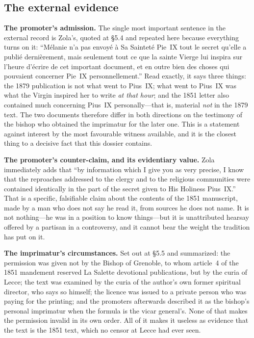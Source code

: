 \subsection{The external evidence}

\textbf{The promoter's admission.} The single most important
sentence in the external record is Zola's, quoted at \S5.4 and
repeated here because everything turns on it: ``Mélanie n'a pas
envoyé à Sa Sainteté Pie~IX tout le secret qu'elle a publié
dernièrement, mais seulement tout ce que la sainte Vierge lui inspira
sur l'heure d'écrire de cet important document, et en outre bien des
choses qui pouvaient concerner Pie~IX personnellement.'' Read
exactly, it says three things: the 1879 publication is not what went
to Pius~IX; what went to Pius~IX was what the Virgin inspired her to
write \emph{at that hour}; and the 1851 letter also contained much
concerning Pius~IX personally---that is, material \emph{not} in the
1879 text. The two documents therefore differ in both directions on
the testimony of the bishop who obtained the imprimatur for the
later one. This is a statement against interest by the most
favourable witness available, and it is the closest thing to a
decisive fact that this dossier contains.

\textbf{The promoter's counter-claim, and its evidentiary value.}
Zola immediately adds that ``by information which I give you as very
precise, I know that the reproaches addressed to the clergy and to
the religious communities were contained identically in the part of
the secret given to His Holiness Pius~IX.'' That is a specific,
falsifiable claim about the contents of the 1851 manuscript, made by
a man who does not say he read it, from sources he does not name.
It is not nothing---he was in a position to know things---but it is
unattributed hearsay offered by a partisan in a controversy, and it
cannot bear the weight the tradition has put on it.

\textbf{The imprimatur's circumstances.} Set out at \S5.5 and
summarized: the permission was given not by the Bishop of Grenoble,
to whom article~4 of the 1851 mandement reserved La Salette
devotional publications, but by the curia of Lecce; the text was
examined by the curia of the author's own former spiritual director,
who says so himself; the licence was issued to a private person who
was paying for the printing; and the promoters afterwards described
it as the bishop's personal imprimatur when the formula is the vicar
general's. None of that makes the permission invalid in its own
order. All of it makes it useless as evidence that the text is the
1851 text, which no censor at Lecce had ever seen.


